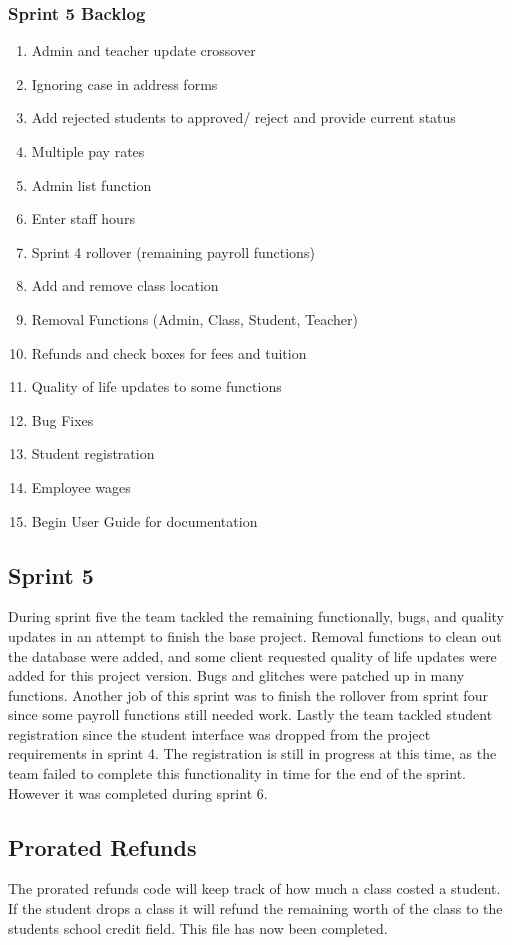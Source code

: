 \subsubsection{Sprint 5 Backlog}

\begin{enumerate}
\item Admin and teacher update crossover
\item Ignoring case in address forms
\item Add rejected students to approved/ reject and provide current status
\item Multiple pay rates
\item Admin list function
\item Enter staff hours
\item Sprint 4 rollover (remaining payroll functions)
\item Add and remove class location
\item Removal Functions (Admin, Class, Student, Teacher)
\item Refunds and check boxes for fees and tuition
\item Quality of life updates to some functions
\item Bug Fixes
\item Student registration
\item Employee wages
\item Begin User Guide for documentation
\end{enumerate}


\subsection{Sprint 5}
During sprint five the team tackled the remaining functionally, bugs, and quality updates in an attempt to finish the base project. Removal functions to clean out the database were added, and some client requested quality of life updates were added for this project version. Bugs and glitches were patched up in many functions. Another job of this sprint was to finish the rollover from sprint four since some payroll functions still needed work. Lastly the team tackled student registration since the student interface was dropped from the project requirements in sprint 4. The registration is still in progress at this time, as the team failed to complete this functionality in time for the end of the sprint. However it was completed during sprint 6.

\subsection{Prorated Refunds}
The prorated refunds code will keep track of how much a class costed a student. If the student drops a class it will refund the remaining worth of the class to the students school credit field. This file has now been completed.

